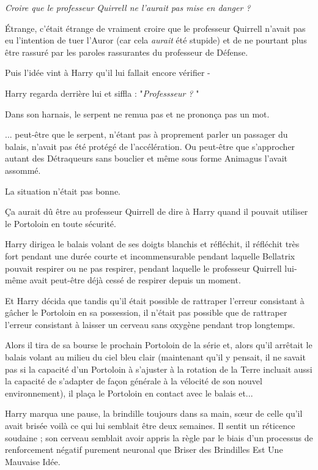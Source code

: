 \emph{Croire que le professeur Quirrell ne l'aurait pas mise en danger ?} 

Étrange, c'était étrange de vraiment croire que le professeur Quirrell n'avait pas eu l'intention de tuer l'Auror (car cela \emph{aurait}  été stupide) et de ne pourtant plus être rassuré par les paroles rassurantes du professeur de Défense.

Puis l'idée vint à Harry qu'il lui fallait encore vérifier -

Harry regarda derrière lui et siffla : "\emph{Professseur ?} "

Dans son harnais, le serpent ne remua pas et ne prononça pas un mot.

... peut-être que le serpent, n'étant pas à proprement parler un passager du balais, n'avait pas été protégé de l'accélération. Ou peut-être que s'approcher autant des Détraqueurs sans bouclier et même sous forme Animagus l'avait assommé.

La situation n'était pas bonne.

Ça aurait dû être au professeur Quirrell de dire à Harry quand il pouvait utiliser le Portoloin en toute sécurité.

Harry dirigea le balais volant de ses doigts blanchis et réfléchit, il réfléchit très fort pendant une durée courte et incommensurable pendant laquelle Bellatrix pouvait respirer ou ne pas respirer, pendant laquelle le professeur Quirrell lui-même avait peut-être déjà cessé de respirer depuis un moment.

Et Harry décida que tandis qu'il était possible de rattraper l'erreur consistant à gâcher le Portoloin en sa possession, il n'était pas possible que de rattraper l'erreur consistant à laisser un cerveau sans oxygène pendant trop longtemps.

Alors il tira de sa bourse le prochain Portoloin de la série et, alors qu'il arrêtait le balais volant au milieu du ciel bleu clair (maintenant qu'il y pensait, il ne savait pas si la capacité d'un Portoloin à s'ajuster à la rotation de la Terre incluait aussi la capacité de s'adapter de façon générale à la vélocité de son nouvel environnement), il plaça le Portoloin en contact avec le balais et...

Harry marqua une pause, la brindille toujours dans sa main, sœur de celle qu'il avait brisée voilà ce qui lui semblait être deux semaines. Il sentit un réticence soudaine ; son cerveau semblait avoir appris la règle par le biais d'un processus de renforcement négatif purement neuronal que Briser des Brindilles Est Une Mauvaise Idée.

